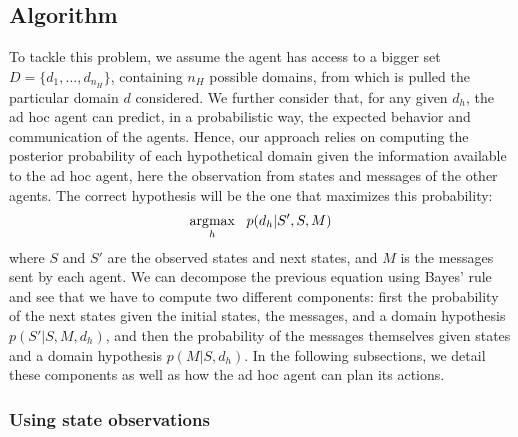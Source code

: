 \subsection{Algorithm}

To tackle this problem, we assume the agent has access to a bigger set $D = \{d_1, \ldots, d_{n_H}\}$, containing $n_H$ possible domains, from which is pulled the particular domain $d$ considered. We further consider that, for any given $d_h$, the ad hoc agent can predict, in a probabilistic way, the expected behavior and communication of the agents. Hence, our approach relies on computing the posterior probability of each hypothetical domain given the information available to the ad hoc agent, here the observation from states and messages of the other agents. The correct hypothesis will be the one that maximizes this probability:
%
\begin{eqnarray}
\operatorname*{\arg\!\max}_h~~p(d_h|S',S,M)  \label{eq:problem}
\end{eqnarray}
%
where $S$ and $S'$ are the observed states and next states, and $M$ is the messages sent by each agent. We can decompose the previous equation using Bayes' rule and see that we have to compute two different components: first the probability of the next states given the initial states, the messages, and a domain hypothesis $p(S'|S,M,d_h)$, and then the probability of the messages themselves given states and a domain hypothesis $p(M|S,d_h)$. In the following subsections, we detail these components as well as how the ad hoc agent can plan its actions.%

\subsubsection{Using state observations}

